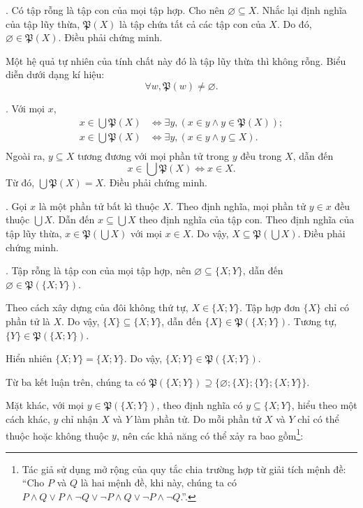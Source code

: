 \solution

\setcounter{subexercise}{1}
. Có tập rỗng là tập con của mọi tập hợp. Cho nên $\varnothing \subseteq X$. Nhắc lại định nghĩa của tập lũy thừa, $\mathfrak{P}(X)$ là tập chứa tất cả các tập con của $X$. Do đó, $\varnothing \in \mathfrak{P}(X)$. Điều phải chứng minh.

Một hệ quả tự nhiên của tính chất này đó là tập lũy thừa thì không rỗng. Biểu diễn dưới dạng kí hiệu:
$$
    \forall w, \mathfrak{P}(w) \neq \varnothing.
$$

. Với mọi $x$,
\begin{align*}
   x \in \bigcup \mathfrak{P}(X) &\iff \exists y, \left(x \in y \land y \in \mathfrak{P}(X) \right); \\
   x \in \bigcup \mathfrak{P}(X) &\iff \exists y, \left(x \in y \land y \subseteq X\right). \\
\end{align*}
Ngoài ra, $y \subseteq X$ tương đương với mọi phần tử trong $y$ đều trong $X$, dẫn đến
\begin{equation*}
   x \in \bigcup \mathfrak{P}(X) \iff x \in X.
\end{equation*}
Từ đó, $\bigcup \mathfrak{P}(X) = X$. Điều phải chứng minh.

. Gọi $x$ là một phần tử bất kì thuộc $X$. Theo định nghĩa, mọi phần tử $y \in x$ đều thuộc $\bigcup X$. Dẫn đến $x \subseteq \bigcup X$ theo định nghĩa của tập con. Theo định nghĩa của tập lũy thừa, $x \in \mathfrak{P} \left(\bigcup X\right)$ với mọi $x \in X$. Do vậy, $X \subseteq \mathfrak{P} \left(\bigcup X\right)$. Điều phải chứng minh.

. Tập rỗng là tập con của mọi tập hợp, nên $\varnothing \subseteq \{X; Y\}$, dẫn đến $\varnothing \in \mathfrak{P}(\{X; Y\})$.

Theo cách xây dựng của đôi không thứ tự, $X \in \{X; Y\}$. Tập hợp đơn $\{X\}$ chỉ có phần tử là $X$. Do vậy, $\{X\} \subseteq \{X; Y\}$, dẫn đến $\{X\} \in \mathfrak{P}(\{X; Y\})$. Tương tự, $\{Y\} \in \mathfrak{P}(\{X; Y\})$.

Hiển nhiên $\{X; Y\} = \{X; Y\}$. Do vậy, $\{X; Y\} \in \mathfrak{P}(\{X; Y\})$.

Từ ba kết luận trên, chúng ta có $\mathfrak{P}(\{X; Y\}) \supseteq \{\varnothing; \{X\}; \{Y\}; \{X; Y\}\}$.

Mặt khác, với mọi $y \in \mathfrak{P}(\{X; Y\})$, theo định nghĩa có $y \subseteq \{X; Y\}$, hiểu theo một cách khác, $y$ chỉ nhận $X$ và $Y$ làm phần tử. Do mỗi phần tử $X$ và $Y$ chỉ có thể thuộc hoặc không thuộc $y$, nên các khả năng có thể xảy ra bao gồm\footnote{Tác giả sử dụng mở rộng của quy tắc chia trường hợp từ giải tích mệnh đề: ``Cho $P$ và $Q$ là hai mệnh đề, khi này, chúng ta có $P \land Q \lor P \land \neg Q \lor \neg P \land Q \lor \neg P \land \neg Q$.''.}:

